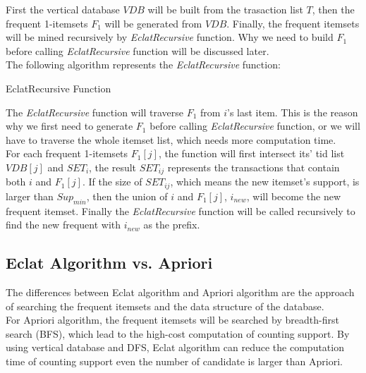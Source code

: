 \documentclass[a4paper, oneside, final, 12pt]{scrartcl} %
\begin{document}
First the vertical database $VDB$ will be built from the trasaction list $T$,
then the frequent 1-itemsets $F_1$ will be generated from $VDB$.
Finally, the frequent itemsets will be mined recursively by \emph{EclatRecursive} function.
Why we need to build $F_1$ before calling \emph{EclatRecursive} function will be discussed later.\\

The following algorithm represents the \emph{EclatRecursive} function:

\begin{algorithm}
  \caption{EclatRecursive Function}

  \BlankLine
\end{algorithm}

The \emph{EclatRecursive} function will traverse $F_1$ from $i$'s last item.
This is the reason why we first need to generate $F_1$ before 
calling \emph{EclatRecursive} function, or we will have to traverse the whole itemset list,
which needs more computation time. \\
For each frequent 1-itemsets $F_1[j]$, the function will first intersect its' tid list $VDB[j]$
and $SET_{i}$, the result $SET_{ij}$ represents the transactions that contain both $i$ and $F_1[j]$.
If the size of $SET_{ij}$, which means the new itemset's support, is larger than $Sup_{min}$,
then the union of $i$ and $F_1[j]$, $i_{new}$, will become the new frequent itemset.
Finally the \emph{EclatRecursive} function will be called recursively
to find the new frequent with $i_{new}$ as the prefix. \\

\subsection{Eclat Algorithm vs. Apriori}

The differences between Eclat algorithm and Apriori algorithm are the approach of
searching the frequent itemsets and the data structure of the database. \\
For Apriori algorithm, the frequent itemsets will be searched by breadth-first search (BFS),
which lead to the high-cost computation of counting support. 
By using vertical database and DFS, 
Eclat algorithm can reduce the computation time of counting support 
even the number of candidate is larger than Apriori.
\end{document}
